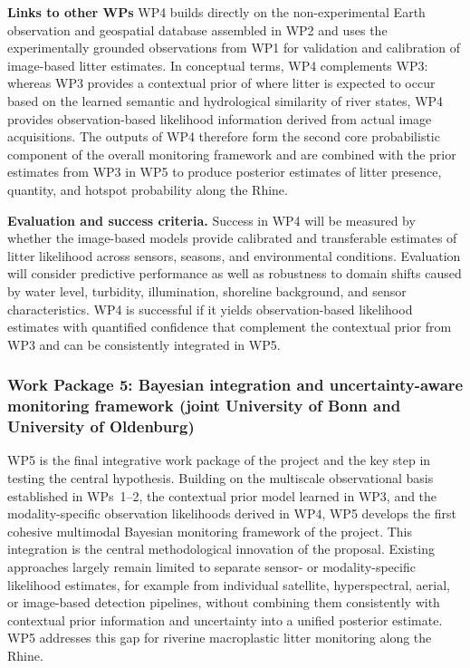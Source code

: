 \documentclass{scrartcl}
\begin{document}
\textbf{Links to other WPs} WP4 builds directly on the non-experimental Earth observation and geospatial database assembled in WP2 and uses the experimentally grounded observations from WP1 for validation and calibration of image-based litter estimates. In conceptual terms, WP4 complements WP3: whereas WP3 provides a contextual prior of where litter is expected to occur based on the learned semantic and hydrological similarity of river states, WP4 provides observation-based likelihood information derived from actual image acquisitions. The outputs of WP4 therefore form the second core probabilistic component of the overall monitoring framework and are combined with the prior estimates from WP3 in WP5 to produce posterior estimates of litter presence, quantity, and hotspot probability along the Rhine.

\textbf{Evaluation and success criteria.} Success in WP4 will be measured by whether the image-based models provide calibrated and transferable estimates of litter likelihood across sensors, seasons, and environmental conditions. Evaluation will consider predictive performance as well as robustness to domain shifts caused by water level, turbidity, illumination, shoreline background, and sensor characteristics. WP4 is successful if it yields observation-based likelihood estimates with quantified confidence that complement the contextual prior from WP3 and can be consistently integrated in WP5.

\subsubsection{Work Package 5: Bayesian integration and uncertainty-aware monitoring framework (joint University of Bonn and University of Oldenburg)}

WP5 is the final integrative work package of the project and the key step in testing the central hypothesis. Building on the multiscale observational basis established in WPs~1--2, the contextual prior model learned in WP3, and the modality-specific observation likelihoods derived in WP4, WP5 develops the first cohesive multimodal Bayesian monitoring framework of the project. This integration is the central methodological innovation of the proposal. Existing approaches largely remain limited to separate sensor- or modality-specific likelihood estimates, for example from individual satellite, hyperspectral, aerial, or image-based detection pipelines, without combining them consistently with contextual prior information and uncertainty into a unified posterior estimate. WP5 addresses this gap for riverine macroplastic litter monitoring along the Rhine.
\end{document}
